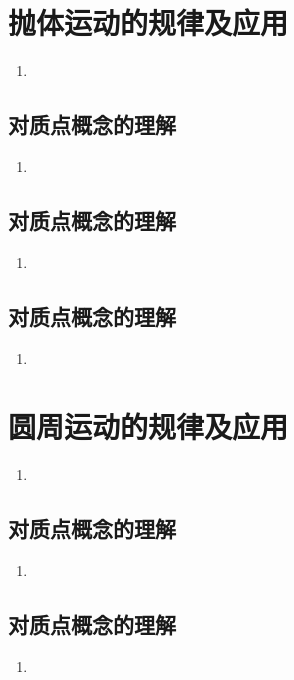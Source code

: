 \documentclass[cn,11pt]{elegantbook}
\begin{document}
\chapter{抛体运动的规律及应用}
\begin{enumerate}
   \item 
\end{enumerate}

\section{对质点概念的理解}
\begin{enumerate}
   \item 
\end{enumerate}

\section{对质点概念的理解}
\begin{enumerate}
   \item 
\end{enumerate}

\section{对质点概念的理解}
\begin{enumerate}
   \item 
\end{enumerate}


\chapter{圆周运动的规律及应用}
\begin{enumerate}
   \item 
\end{enumerate}

\section{对质点概念的理解}
\begin{enumerate}
   \item 
\end{enumerate}

\section{对质点概念的理解}
\begin{enumerate}
   \item 
\end{enumerate}
\end{document}

